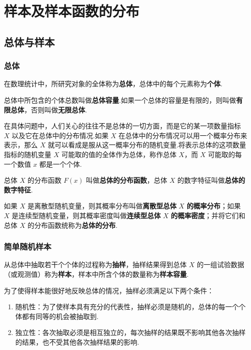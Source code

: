 
\chapter{样本及样本函数的分布}

\section{总体与样本}

\subsection{总体}

在数理统计中，所研究对象的全体称为\textbf{总体}，总体中的每个元素称为\textbf{个体}.

总体中所包含的个体总数叫做\textbf{总体容量}.如果一个总体的容量是有限的，则叫做\textbf{有限总体}，否则叫做\textbf{无限总体}.

在具体问题中，人们关心的往往不是总体的一切方面，而是它的某一项数量指标 $X$ 以及它在总体中的分布情况.如果 $X$ 在总体中的分布情况可以用一个概率分布来表示，那么 $X$ 就可以看成是服从这一概率分布的随机变量.将表示总体的这项数量指标的随机变量 $X$ 可能取的值的全体作为总体，称作总体 $X$，而 $X$ 可能取的每一个数值 $x$ 都是一个个体.

总体 $X$ 的分布函数 $F(x)$ 叫做\textbf{总体的分布函数}，总体 $X$ 的数字特征叫做\textbf{总体的数字特征}.

如果 $X$ 是离散型随机变量，则其概率分布叫做\textbf{离散型总体} $X$ \textbf{的概率分布}；如果 $X$ 是连续型随机变量，则其概率密度叫做\textbf{连续型总体} $X$ \textbf{的概率密度}；并将它们和总体 $X$ 的分布函数统称为\textbf{总体的分布}.

\subsection{简单随机样本}

从总体中抽取若干个个体的过程称为\textbf{抽样}，抽样结果得到总体 $X$ 的一组试验数据（或观测值）称为\textbf{样本}，样本中所含个体的数量称为\textbf{样本容量}.

为了使得样本能很好地反映总体的情况，抽样必须满足以下两个条件：
\begin{enumerate}
    \item 随机性：为了使样本具有充分的代表性，抽样必须是随机的，总体的每一个个体都有同等的机会被抽取到.
    \item 独立性：各次抽取必须是相互独立的，每次抽样的结果既不影响其他各次抽样的结果，也不受其他各次抽样结果的影响.
\end{enumerate}

